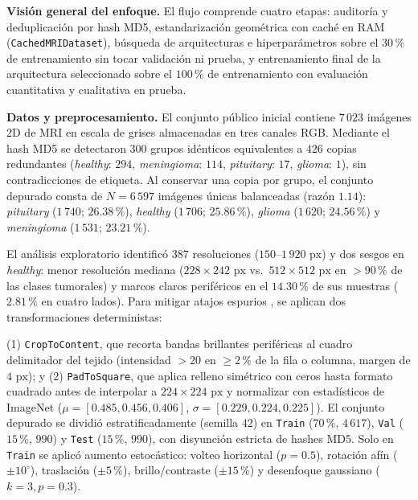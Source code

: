 \documentclass[letterpaper, 10 pt, conference]{ieeeconf}
\makeatletter
\def\section{\@startsection{section}{1}{\z@}{0.9ex plus 0.4ex minus 0.3ex}{0.35ex plus 0.2ex minus 0ex}{\normalfont\normalsize\centering\scshape}}
\makeatother
\begin{document}
\section{Metodología}

\textbf{Visión general del enfoque.} 
El flujo comprende cuatro etapas: auditoría y deduplicación por hash MD5, estandarización geométrica con caché en RAM (\texttt{CachedMRIDataset}), búsqueda de arquitecturas e hiperparámetros sobre el \(30\,\%\) de entrenamiento sin tocar validación ni prueba, y entrenamiento final de la arquitectura seleccionado sobre el \(100\,\%\) de entrenamiento con evaluación cuantitativa y cualitativa en prueba.

\textbf{Datos y preprocesamiento.} 
El conjunto público inicial contiene \(7\,023\) imágenes 2D de MRI en escala de grises almacenadas en tres canales RGB. Mediante el hash MD5 se detectaron \(300\) grupos idénticos equivalentes a \(426\) copias redundantes (\textit{healthy}: \(294\), \textit{meningioma}: \(114\), \textit{pituitary}: \(17\), \textit{glioma}: \(1\)), sin contradicciones de etiqueta. Al conservar una copia por grupo, el conjunto depurado consta de \(N = 6\,597\) imágenes únicas balanceadas (razón \(1.14\)): \textit{pituitary} (\(1\,740\); \(26.38\,\%\)), \textit{healthy} (\(1\,706\); \(25.86\,\%\)), \textit{glioma} (\(1\,620\); \(24.56\,\%\)) y \textit{meningioma} (\(1\,531\); \(23.21\,\%\)). 

El análisis exploratorio identificó \(387\) resoluciones (\(150\text{--}1\,920\text{ px}\)) y dos sesgos en \textit{healthy}: menor resolución mediana (\(228\times 242\text{ px}\) vs.~\(512\times 512\text{ px}\) en \(>90\,\%\) de las clases tumorales) y marcos claros periféricos en el \(14.30\,\%\) de sus muestras (\(2.81\,\%\) en cuatro lados). Para mitigar atajos espurios \cite{c3}, se aplican dos transformaciones deterministas: 

(1) \texttt{CropToContent}, que recorta bandas brillantes periféricas al cuadro delimitador del tejido (intensidad \(> 20\) en \(\ge 2\,\%\) de la fila o columna, margen de \(4\text{ px}\)); y 
(2) \texttt{PadToSquare}, que aplica relleno simétrico con ceros hasta formato cuadrado antes de interpolar a \(224\times 224\text{ px}\) y normalizar con estadísticos de ImageNet (\(\mu = [0.485, 0.456, 0.406]\), \(\sigma = [0.229, 0.224, 0.225]\)). El conjunto depurado se dividió estratificadamente (semilla \(42\)) en \texttt{Train} (\(70\,\%\), \(4\,617\)), \texttt{Val} (\(15\,\%\), \(990\)) y \texttt{Test} (\(15\,\%\), \(990\)), con disyunción estricta de hashes MD5. Solo en \texttt{Train} se aplicó aumento estocástico: volteo horizontal (\(p=0.5\)), rotación afín (\(\pm 10^\circ\)), traslación (\(\pm 5\,\%\)), brillo/contraste (\(\pm 15\,\%\)) y desenfoque gaussiano (\(k=3, p=0.3\)).
\end{document}
